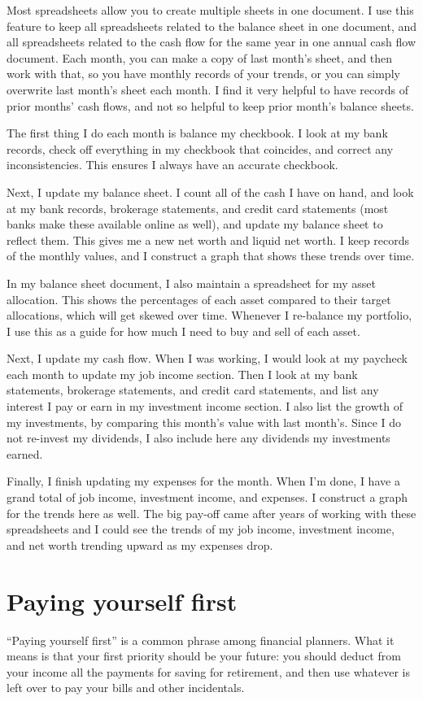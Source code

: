 Most spreadsheets allow you to create multiple sheets in one document. I use this feature to keep all spreadsheets related to the balance sheet in one document, and all spreadsheets related to the cash flow for the same year in one annual cash flow document. Each month, you can make a copy of last month's sheet, and then work with that, so you have monthly records of your trends, or you can simply overwrite last month's sheet each month. I find it very helpful to have records of prior months' cash flows, and not so helpful to keep prior month's balance sheets.

The first thing I do each month is balance my checkbook. I look at my bank records, check off everything in my checkbook that coincides, and correct any inconsistencies. This ensures I always have an accurate checkbook.

Next, I update my balance sheet. I count all of the cash I have on hand, and look at my bank records, brokerage statements, and credit card statements (most banks make these available online as well), and update my balance sheet to reflect them. This gives me a new net worth and liquid net worth. I keep records of the monthly values, and I construct a graph that shows these trends over time.

In my balance sheet document, I also maintain a spreadsheet for my asset allocation. This shows the percentages of each asset compared to their target allocations, which will get skewed over time. Whenever I re-balance my portfolio, I use this as a guide for how much I need to buy and sell of each asset.

Next, I update my cash flow. When I was working, I would look at my paycheck each month to update my job income section. Then I look at my bank statements, brokerage statements, and credit card statements, and list any interest I pay or earn in my investment income section. I also list the growth of my investments, by comparing this month's value with last month's. Since I do not re-invest my dividends, I also include here any dividends my investments earned.

Finally, I finish updating my expenses for the month. When I'm done, I have a grand total of job income, investment income, and expenses. I construct a graph for the trends here as well. The big pay-off came after years of working with these spreadsheets and I could see the trends of my job income, investment income, and net worth trending upward as my expenses drop.

\section{Paying yourself first}
``Paying yourself first'' is a common phrase among financial planners. What it means is that your first priority should be your future: you should deduct from your income all the payments for saving for retirement, and then use whatever is left over to pay your bills and other incidentals.

